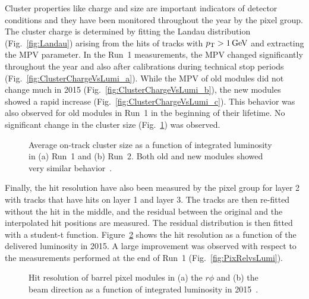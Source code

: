 Cluster properties like charge and size are important indicators of detector conditions and they have been monitored throughout the year by the pixel group.
The cluster charge is determined by fitting the Landau distribution (Fig.~\ref{fig:Landau}) arising from the hits of tracks with $p_{\mathrm{T}} > 1\,\text{Ge\hspace{-.08em}V}$ and extracting the MPV parameter.
In the Run~1 measurements, the MPV changed significantly throughout the year and also after calibrations during technical stop periods (Fig.~\ref{fig:ClusterChargeVsLumi_a}).
While the MPV of old modules did not change much in 2015 (Fig.~\ref{fig:ClusterChargeVsLumi_b}), the new modules showed a rapid increase (Fig.~\ref{fig:ClusterChargeVsLumi_c}).
This behavior was also observed for old modules in Run~1 in the beginning of their lifetime. No significant change in the cluster size (Fig.~\ref{fig:ClusterSizeVsLumi}) was observed.

\begin{figure}[!htb]
 \begin{center}
 \end{center}
 \caption{Average on-track cluster size as a function of integrated luminosity in (a) Run~1 and (b) Run~2. Both old and new modules showed very similar behavior~\cite{PixelOffline}.}
 \label{fig:ClusterSizeVsLumi}
\end{figure}

Finally, the hit resolution have also been measured by the pixel group for layer 2 with tracks that have hits on layer 1 and layer 3.
The tracks are then re-fitted without the hit in the middle, and the residual between the original and the interpolated hit positions are measured.
The residual distribution is then fitted with a student-t function. Figure~\ref{fig:RelVsLumi2015} shows the hit resolution as a function of the delivered luminosity in 2015.
A large improvement was observed with respect to the measurements performed at the end of Run~1 (Fig.~\ref{fig:PixRelvsLumi}).

\begin{figure}[!htb]
 \begin{center}
 \end{center}
 \caption{Hit resolution of barrel pixel modules in (a) the $r\phi$ and (b) the beam direction as a function of integrated luminosity in 2015~\cite{PixelOffline}.}
 \label{fig:RelVsLumi2015}
\end{figure}
